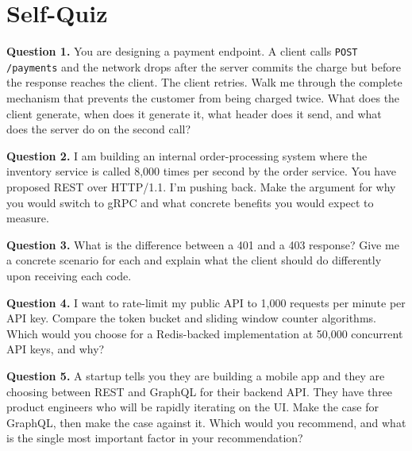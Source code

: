 \documentclass[11pt,a4paper]{article}
\begin{document}
\newpage
\section{Self-Quiz}

\begin{quizbox}
\textbf{Question 1.} You are designing a payment endpoint. A client calls \texttt{POST /payments} and the network drops after the server commits the charge but before the response reaches the client. The client retries. Walk me through the complete mechanism that prevents the customer from being charged twice. What does the client generate, when does it generate it, what header does it send, and what does the server do on the second call?

\vspace{10pt}

\textbf{Question 2.} I am building an internal order-processing system where the inventory service is called 8,000 times per second by the order service. You have proposed REST over HTTP/1.1. I'm pushing back. Make the argument for why you would switch to gRPC and what concrete benefits you would expect to measure.

\vspace{10pt}

\textbf{Question 3.} What is the difference between a 401 and a 403 response? Give me a concrete scenario for each and explain what the client should do differently upon receiving each code.

\vspace{10pt}

\textbf{Question 4.} I want to rate-limit my public API to 1,000 requests per minute per API key. Compare the token bucket and sliding window counter algorithms. Which would you choose for a Redis-backed implementation at 50,000 concurrent API keys, and why?

\vspace{10pt}

\textbf{Question 5.} A startup tells you they are building a mobile app and they are choosing between REST and GraphQL for their backend API. They have three product engineers who will be rapidly iterating on the UI. Make the case for GraphQL, then make the case against it. Which would you recommend, and what is the single most important factor in your recommendation?
\end{quizbox}
\end{document}
